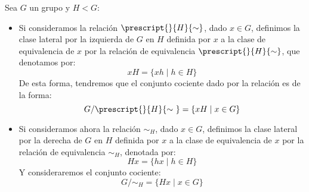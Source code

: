 \begin{definicion}
    Sea $G$ un grupo y $H < G$:
    \begin{itemize}
        \item Si consideramos la relación $\prescript{}{H}{\sim}$, dado $x\in G$, definimos la clase lateral por la izquierda de $G$ en $H$ definida por $x$ a la clase de equivalencia de $x$ por la relación de equivalencia $\prescript{}{H}{\sim}$, que denotamos por:
            \begin{equation*}
                xH = \{xh\mid h \in H\}
            \end{equation*}
            De esta forma, tendremos que el conjunto cociente dado por la relación es de la forma:
            \begin{equation*}
                G/\prescript{}{H}{\sim\ } = \{xH \mid x\in G\}
            \end{equation*}
        \item Si consideramos ahora la relación $\sim_H$, dado $x\in G$, definimos la clase lateral por la derecha de $G$ en $H$ definida por $x$ a la clase de equivalencia de $x$ por la relación de equivalencia $\sim_H$, denotada por:
            \begin{equation*}
                Hx = \{hx\mid h\in H\}
            \end{equation*}
            Y consideraremos el conjunto cociente:
            \begin{equation*}
                G/\sim_H = \{Hx \mid x \in G\}
            \end{equation*}
    \end{itemize}
\end{definicion}

